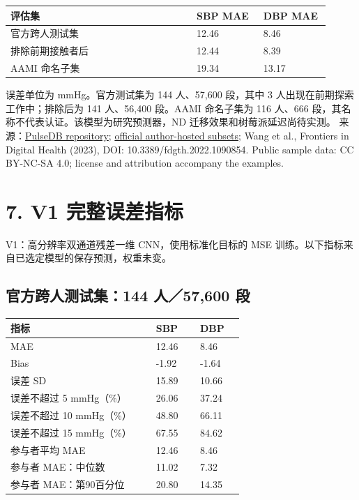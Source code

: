\documentclass[11pt,letterpaper]{article}
\renewcommand{\arraystretch}{1.22}
\begin{document}
\par\smallskip
\begin{tabular}{@{}p{0.53\linewidth}p{0.19\linewidth}p{0.19\linewidth}@{}}\toprule
评估集 & SBP MAE & DBP MAE\\\midrule
官方跨人测试集 & 12.46 & 8.46\\
排除前期接触者后 & 12.44 & 8.39\\
AAMI 命名子集 & 19.34 & 13.17\\
\bottomrule\end{tabular}\par\smallskip
误差单位为 mmHg。官方测试集为 144 人、57,600 段，其中 3 人出现在前期探索工作中；排除后为 141 人、56,400 段。AAMI 命名子集为 116 人、666 段，其名称不代表认证。该模型为研究预测器，ND 迁移效果和树莓派延迟尚待实测。
\small 来源：\href{https://github.com/pulselabteam/PulseDB}{PulseDB repository}; \href{https://www.kaggle.com/datasets/weinanwangrutgers/pulsedb-balanced-training-and-testing}{official author-hosted subsets}; Wang et al., Frontiers in Digital Health (2023), DOI: 10.3389/fdgth.2022.1090854. Public sample data: CC BY-NC-SA 4.0; license and attribution accompany the examples.\newpage
\section*{7. V1 完整误差指标}
V1：高分辨率双通道残差一维 CNN，使用标准化目标的 MSE 训练。以下指标来自已选定模型的保存预测，权重未变。
\subsection*{官方跨人测试集：144 人／57,600 段}
{\small\renewcommand{\arraystretch}{1.05}

\par\smallskip
\begin{tabular}{@{}p{0.57\linewidth}p{0.17\linewidth}p{0.17\linewidth}@{}}\toprule
指标 & SBP & DBP\\\midrule
MAE & 12.46 & 8.46\\
Bias & -1.92 & -1.64\\
误差 SD & 15.89 & 10.66\\
误差不超过 5 mmHg（\%） & 26.06 & 37.24\\
误差不超过 10 mmHg（\%） & 48.80 & 66.11\\
误差不超过 15 mmHg（\%） & 67.55 & 84.62\\
参与者平均 MAE & 12.46 & 8.46\\
参与者 MAE：中位数 & 11.02 & 7.32\\
参与者 MAE：第90百分位 & 20.80 & 14.35\\
\bottomrule\end{tabular}\par\smallskip
}
\end{document}
